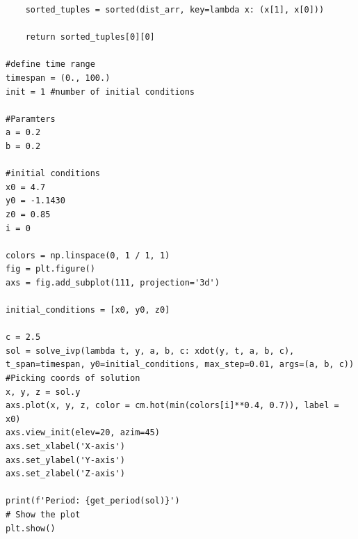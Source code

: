\begin{solution}
\begin{lstlisting}
    sorted_tuples = sorted(dist_arr, key=lambda x: (x[1], x[0]))
    
    return sorted_tuples[0][0]

#define time range
timespan = (0., 100.)
init = 1 #number of initial conditions

#Paramters
a = 0.2
b = 0.2

#initial conditions
x0 = 4.7
y0 = -1.1430
z0 = 0.85
i = 0

colors = np.linspace(0, 1 / 1, 1)
fig = plt.figure()
axs = fig.add_subplot(111, projection='3d')

initial_conditions = [x0, y0, z0]

c = 2.5
sol = solve_ivp(lambda t, y, a, b, c: xdot(y, t, a, b, c), t_span=timespan, y0=initial_conditions, max_step=0.01, args=(a, b, c))
#Picking coords of solution
x, y, z = sol.y
axs.plot(x, y, z, color = cm.hot(min(colors[i]**0.4, 0.7)), label = x0)
axs.view_init(elev=20, azim=45) 
axs.set_xlabel('X-axis')
axs.set_ylabel('Y-axis')
axs.set_zlabel('Z-axis')

print(f'Period: {get_period(sol)}')
# Show the plot
plt.show()

\end{lstlisting}
\end{solution}

\newpage
